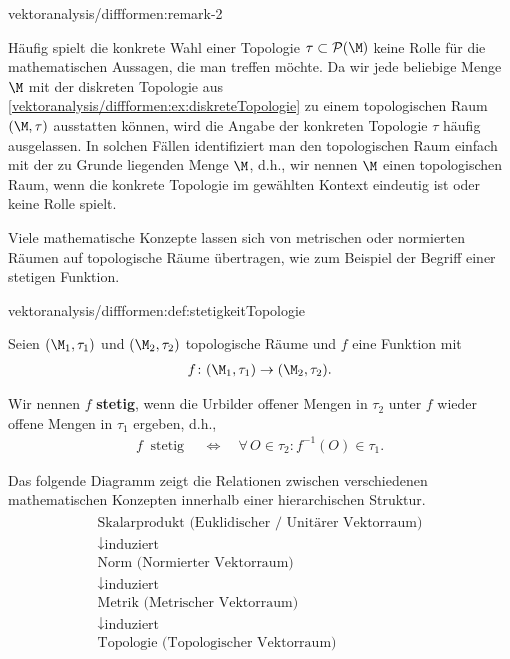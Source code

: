 \documentclass[letterpaper,10pt,english]{jupyterBook}
\begin{document}
\begin{remark}{}{vektoranalysis/diffformen:remark-2}



\par
Häufig spielt die konkrete Wahl einer Topologie \(\tau \subset \mathcal{P}(\M)\) keine Rolle für die mathematischen Aussagen, die man treffen möchte.
Da wir jede beliebige Menge \(\M\) mit der diskreten Topologie aus \cref{vektoranalysis/diffformen:ex:diskreteTopologie} zu einem topologischen Raum \((\M, \tau)\) ausstatten können, wird die Angabe der konkreten Topologie \(\tau\) häufig ausgelassen.
In solchen Fällen identifiziert man den topologischen Raum einfach mit der zu Grunde liegenden Menge \(\M\), d.h., wir nennen \(\M\) einen topologischen Raum, wenn die konkrete Topologie im gewählten Kontext eindeutig ist oder keine Rolle spielt.
\end{remark}

\par
Viele mathematische Konzepte lassen sich von metrischen oder normierten Räumen auf topologische Räume übertragen, wie zum Beispiel der Begriff einer stetigen Funktion.
\begin{definition}{}{vektoranalysis/diffformen:def:stetigkeitTopologie}



\par
Seien \((\M_1, \tau_1)\) und \((\M_2, \tau_2)\) topologische Räume und \(f\) eine Funktion mit
\begin{align*}
f \colon (\M_1, \tau_1) \rightarrow (\M_2, \tau_2).
\end{align*}
\par
Wir nennen \(f\) \textbf{stetig}, wenn die Urbilder offener Mengen in \(\tau_2\) unter \(f\) wieder offene Mengen in \(\tau_1\) ergeben, d.h.,
\begin{align*}
f \ \text{ stetig } \quad \Leftrightarrow \quad \forall \, O \in \tau_2 : f^{-1}(O) \in \tau_1.
\end{align*}\end{definition}

\par
Das folgende Diagramm zeigt die Relationen zwischen verschiedenen mathematischen Konzepten innerhalb einer hierarchischen Struktur.
\begin{align*}
\begin{gathered}
\text{Skalarprodukt (Euklidischer / Unitärer Vektorraum)}\\
\downarrow \text{induziert}\\
\text{Norm (Normierter Vektorraum)}\\
\downarrow \text{induziert}\\             
\text{Metrik (Metrischer Vektorraum)}\\
\downarrow \text{induziert}\\                 
\text{Topologie (Topologischer Vektorraum)}
\end{gathered}
\end{align*}
\end{document}
